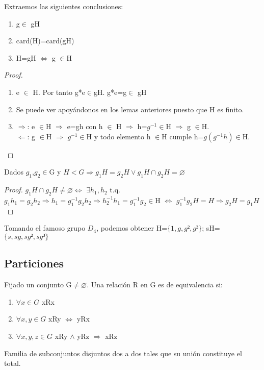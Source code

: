 \documentclass[a4paper,10pt]{apuntes}
\newenvironment{example}[1][Ejemplo]{\begin{trivlist}
\item[\hskip \labelsep {\bfseries #1}]}{\end{trivlist}}
\begin{document}
  \begin{corol} 
  Extraemos las siguientes conclusiones:
   \begin{enumerate}
    \item g$\in$  gH
    \item card(H)=card(gH)
    \item H=gH $\Leftrightarrow$  g $\in$H
   \end{enumerate}
  \end{corol}

  \begin{proof}
   \begin{enumerate}
    \item e $\in$  H. Por tanto g*e$\in$gH. g*e=g$\in$ gH
    \item Se puede ver apoyándonos en los lemas anteriores puesto que H es finito.
    \item $\Rightarrow$:  e $\in$H $\Rightarrow$ e=gh con h $\in$ H $\Rightarrow$ h=$g^{-1}\in$H $\Rightarrow$ g $\in$H.\\
	  $\Leftarrow$:  g $\in$H $\Rightarrow$ $g^{-1}\in$H y todo elemento h $\in$H cumple h=$g(g^{-1}h)\in$H.
   \end{enumerate}
  \end{proof}
  
  \begin{prop}
   Dados $g_{1}$,$g_{2}\in$G y $H<G\Rightarrow g_{1}H=g_{2}H \vee g_{1}H\cap g_{2}H=\varnothing$
  \end{prop}
  \begin{proof}
   $g_{1}H\cap g_{2}H \neq \varnothing \Leftrightarrow$ $\exists h_{1},h_{2}$  t.q. $g_{1}h_{1}=g_{2}h_{2} \Rightarrow h_{1}=g_{1}^{-1}g_{2}h_{2} \Rightarrow h_{2}^{-1}h_{1}=g_{1}^{-1}g_{2}\in$H
   $\Leftrightarrow$ $g_{1}^{-1}g_{2}H=H \Rightarrow g_{2}H=g_{1}H$
  \end{proof}
  \begin{example}
   Tomando el famoso grupo $D_{4}$, podemos obtener H=$\{1,g,g²,g³\}$; sH=$\{s,sg,sg²,sg³\}$
  \end{example}
  \subsection{Particiones}
  \begin{defn}
   Fijado un conjunto G$\neq\varnothing$. Una relación R en G es de equivalencia si:
   \begin{enumerate}
    \item $\forall x\in G$  xRx
    \item $\forall x,y \in G$  xRy $\Leftrightarrow$  yRx
    \item $\forall x,y,z \in G$  xRy $\wedge$  yRz $\Rightarrow$  xRz
   \end{enumerate}
  \end{defn}
  \begin{defn}[Partición]
   Familia de subconjuntos disjuntos dos a dos tales que su unión constituye el total.
  \end{defn}
  
\end{document}
